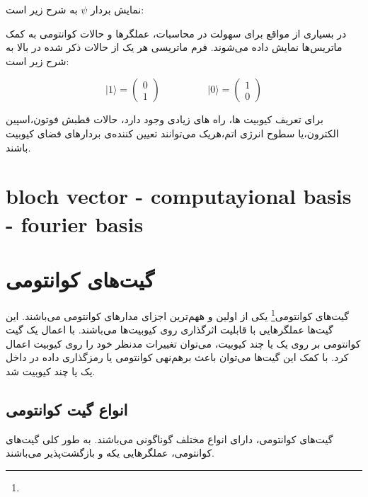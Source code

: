 \documentclass{book}
\begin{document}
نمایش بردار $\psi$ به شرح زیر است:
\begin{center}
\end{center}

در بسیاری از مواقع برای سهولت در محاسبات، عملگر‌ها و حالات کوانتومی به کمک ماتریس‌ها نمایش داده ‌می‌شوند. فرم ماتریسی هر یک از حالات ذکر شده در بالا به شرح زیر است:

\begin{equation}
	\vert 1 \rangle = \begin{pmatrix} 0 \\ 1 \end{pmatrix}
	\hspace{2cm}
	\vert 0 \rangle = \begin{pmatrix} 1 \\ 0 \end{pmatrix}	
\end{equation}

برای تعریف کیوبیت ها، راه های زیادی وجود دارد، حالات قطبش فوتون،‌اسپین الکترون،‌یا سطوح انرژی اتم،‌هریک می‌توانند تعیین کننده‌ی بردار‌های فضای کیوبیت باشند.

\section{bloch vector - computayional basis - fourier basis}
\section{گیت‌های کوانتومی}
گیت‌های کوانتومی\footnote{} یکی از اولین و ههم‌ترین اجزای‌ مدار‌های کوانتومی ‌می‌باشند. این گیت‌ها عملگر‌هایی با قابلیت اثر‌گذاری روی کیوبیت‌ها می‌باشند. با اعمال یک گیت کوانتومی بر روی یک یا چند کیوبیت، می‌توان تغییرات مدنظر خود را روی کیوبیت اعمال کرد. با کمک این گیت‌ها می‌توان باعث برهم‌نهی کوانتومی یا رمز‌گذاری داده در داخل یک یا چند کیوبیت شد.

\subsection{انواع گیت کوانتومی}
گیت‌های کوانتومی، دارای انواع مختلف گوناگونی می‌باشند. به طور کلی گیت‌های کوانتومی، عملگر‌هایی یکه و بازگشت‌پذیر می‌باشند. 
\end{document}
